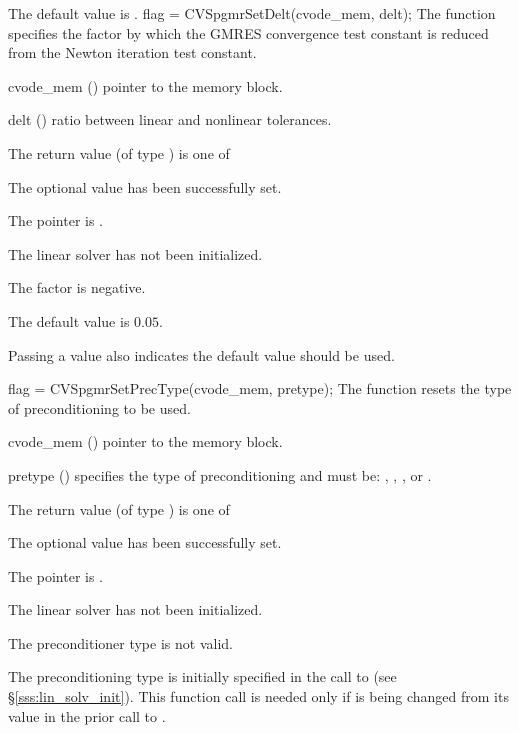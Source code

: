 {
  The default value is .
}
{
  flag = CVSpgmrSetDelt(cvode\_mem, delt);
}
{
  The function  specifies the factor by
  which the GMRES convergence test constant is reduced
  from the Newton iteration test constant.
}
{
  \begin{args}
  \item[cvode\_mem] ()
    pointer to the {\cvodes} memory block.
  \item[delt] () ratio between linear and nonlinear tolerances.

  \end{args}
}
{
  The return value  (of type ) is one of
  \begin{args}
  \item[\Id{CVSPGMR\_SUCCESS}] 
    The optional value has been successfully set.
  \item[\Id{CVSPGMR\_MEM\_NULL}]
    The  pointer is .
  \item[\Id{CVSPGMR\_LMEM\_NULL}]
    The {\cvspgmr} linear solver has not been initialized.
  \item[\Id{CVSPGMR\_ILL\_INPUT}]
    The factor  is negative.  
  \end{args}
}
{
  The default value is $0.05$.

  Passing a value  also indicates the default value should be used.
}
{
  flag = CVSpgmrSetPrecType(cvode\_mem, pretype);
}
{
  The function  resets the type
  of preconditioning to be used.
}
{
  \begin{args}
  \item[cvode\_mem] ()
    pointer to the {\cvodes} memory block.
  \item[pretype] ()
    specifies the type of preconditioning and must be:
    , , , or .
  \end{args}
}
{
  The return value  (of type ) is one of
  \begin{args}
  \item[\Id{CVSPGMR\_SUCCESS}] 
    The optional value has been successfully set.
  \item[\Id{CVSPGMR\_MEM\_NULL}]
    The  pointer is .
  \item[\Id{CVSPGMR\_LMEM\_NULL}]
    The {\cvspgmr} linear solver has not been initialized.
  \item[\Id{CVSPGMR\_ILL\_INPUT}]
    The preconditioner type  is not valid.
  \end{args}
}
{
  The preconditioning type is initially specified in the call
  to  (see \S\ref{sss:lin_solv_init}). This function call is
  needed only if  is being changed from its value in the
  prior call to .
}

